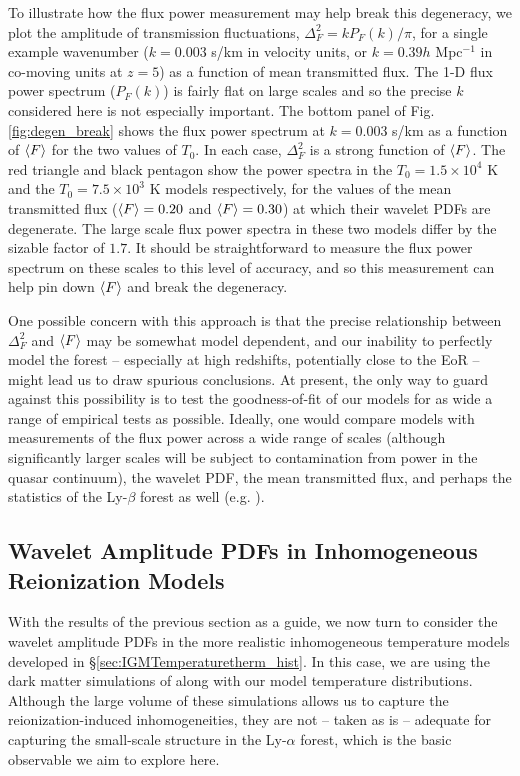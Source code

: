 To illustrate how the flux power measurement may help break this degeneracy, we plot the
amplitude of transmission fluctuations, $\Delta^2_F =k P_F(k)/\pi$, for a single example wavenumber ($k=0.003$ s/km in velocity units, or $k=0.39 h$ Mpc$^{-1}$
in co-moving units at $z=5$) as a function of mean transmitted flux.  The 1-D flux power spectrum ($P_F(k)$) is fairly flat on large scales and so the precise $k$ considered
here is not especially important.  The bottom panel of Fig. \ref{fig:degen_break} shows the flux power spectrum at $k=0.003$ s/km
as a function of $\langle F \rangle$ for the two values of $T_0$. In each case, $\Delta^2_F$ is a strong function of $\langle F \rangle$. The red
triangle and black pentagon show the power spectra in the $T_0 = 1.5 \times 10^4$ K and the $T_0 = 7.5 \times 10^3$ K
models respectively, for the values of the mean transmitted flux ($\langle F \rangle=0.20$ and $\langle F \rangle=0.30$) at which their wavelet
PDFs are degenerate. The large scale flux power spectra in these two models differ by the sizable factor of $1.7$. It should be
straightforward to measure the flux power spectrum on these scales to this level of accuracy, and so this measurement can help
pin down $\langle F \rangle$ and break the degeneracy.

One possible concern with this approach is that the precise relationship between $\Delta^2_F$ and $\langle F \rangle$ may be somewhat model dependent, and our inability to perfectly model the forest -- especially at high redshifts, potentially close to the EoR -- 
might lead us to draw spurious conclusions. At present, the only way to guard against this possibility is to test the goodness-of-fit
of our models for as wide a range of empirical tests as possible. Ideally, one would compare models with measurements of the
flux power across a wide range of scales (although significantly larger scales will be subject to contamination from power in
the quasar continuum), the wavelet PDF, the mean transmitted
flux, and perhaps the statistics of the Ly-$\beta$ forest as well (e.g. \citealt{Dijkstra:2003pd,Furlanetto:2009kr}).  


\subsection{Wavelet Amplitude PDFs in Inhomogeneous Reionization Models}
\label{sec:IGMTemperaturewave_inhomog}

With the results of the previous section as a guide, we now turn to consider the wavelet amplitude PDFs in the more realistic inhomogeneous temperature models developed 
in \S \ref{sec:IGMTemperaturetherm_hist}. In this case, we are using the dark matter simulations of \citet{McQuinn:2007dy} along with our model temperature
distributions.
Although the large volume of these simulations allows us to capture the reionization-induced inhomogeneities, they 
are not -- taken as is -- adequate
for capturing the small-scale structure in the Ly-$\alpha$ forest, which is the basic observable we aim to explore here. 


